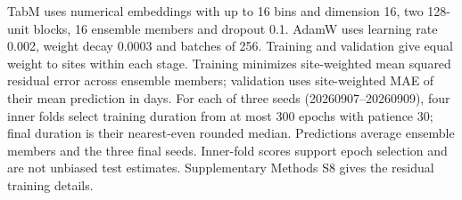 \documentclass[a4paper,12pt]{article}
\begin{document}
TabM uses numerical embeddings with up to 16 bins and dimension 16, two 128-unit blocks,
16 ensemble members and dropout 0.1. AdamW uses learning rate 0.002, weight
decay 0.0003 and batches of 256. Training and validation give equal weight to
sites within each stage. Training minimizes site-weighted mean squared residual
error across ensemble members; validation uses site-weighted MAE of their mean
prediction in days. For each of three seeds (20260907--20260909), four
inner folds select training duration from at most 300 epochs with patience 30;
final duration is their nearest-even rounded median. Predictions average
ensemble members and the three final seeds. Inner-fold scores support epoch
selection and are not unbiased test estimates. Supplementary Methods S8 gives
the residual training details.

\clearpage
\begingroup
{}
\fontsize{11}{13.2}\selectfont
\setlength{\tabcolsep}{3pt}
\setlength{\LTleft}{0pt}
\setlength{\LTright}{\fill}
\renewcommand{\arraystretch}{1.05}
\end{document}
